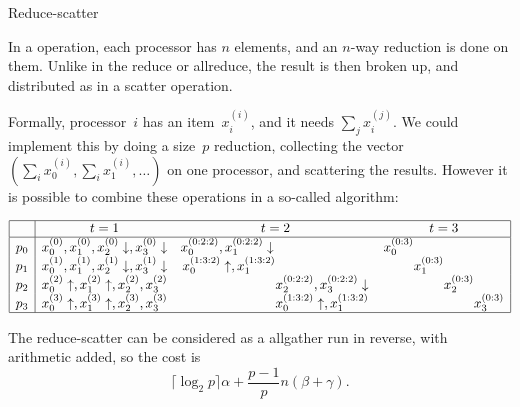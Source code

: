 
 {Reduce-scatter}

In a  operation, each processor has $n$
elements, and an $n$-way reduction is done on them. Unlike in the
reduce or allreduce, the result is then broken up, and distributed as
in a scatter operation.

Formally, processor~$i$ has an
item~$x_i^{(i)}$, and it needs $\sum_j x_i^{(j)}$. We could implement
this by doing a size~$p$ reduction, collecting the vector $(\sum_i
x_0^{(i)},\sum_i x_1^{(i)},\ldots)$ on one processor, and scattering
the results. However it is possible to combine these operations in a
so-called  algorithm:

\[
\begin{array}{|c|ccc|}
\hline
  &t=1&t=2&t=3\\ \hline
p_0&x_0^{(0)},x_1^{(0)},x_2^{(0)}\downarrow,x_3^{(0)}\downarrow
   &x_0^{(0:2:2)},x_1^{(0:2:2)}\downarrow
    \hphantom{x_0^{(0:2:2)},x_1^{(0:2:2)}\downarrow}
   &x_0^{(0:3)}
    \hphantom{x_3^{(0:3)}x_3^{(0:3)}x_3^{(0:3)}}\\
p_1&x_0^{(1)},x_1^{(1)},x_2^{(1)}\downarrow,x_3^{(1)}\downarrow
   &x_0^{(1:3:2)}\uparrow,x_1^{(1:3:2)}
    \hphantom{x_0^{(0:2:2)},x_1^{(0:2:2)}\downarrow}
   &\hphantom{x_3^{(0:3)}} x_1^{(0:3)}
    \hphantom{x_3^{(0:3)}x_3^{(0:3)}} \\
p_2&x_0^{(2)}\uparrow,x_1^{(2)}\uparrow,x_2^{(2)},x_3^{(2)}
   &\hphantom{x_0^{(0:2:2)},x_1^{(0:2:2)}\downarrow}
    x_2^{(0:2:2)},x_3^{(0:2:2)}\downarrow
   &\hphantom{x_3^{(0:3)}x_3^{(0:3)}} x_2^{(0:3)}
    \hphantom{x_3^{(0:3)}}\\
p_3&x_0^{(3)}\uparrow,x_1^{(3)}\uparrow,x_2^{(3)},x_3^{(3)}
   &\hphantom{x_0^{(0:2:2)},x_1^{(0:2:2)}\downarrow}
    x_0^{(1:3:2)}\uparrow,x_1^{(1:3:2)}
   &\hphantom{x_3^{(0:3)}x_3^{(0:3)}x_3^{(0:3)}}
    x_3^{(0:3)}\\
\hline
\end{array}
\]

The reduce-scatter can be considered as a allgather run in reverse,
with arithmetic added, so the cost is 
\[ \lceil \log_2 p\rceil\alpha +\frac{p-1}pn(\beta+\gamma). \]

